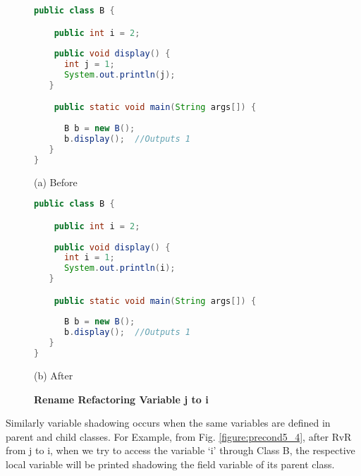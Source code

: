 \begin{figure}[th]
\centering
\begin{minipage}[t]{0.8\linewidth}
\begin{lstlisting}[language=java, basicstyle=\scriptsize\ttfamily,frame=single]
public class B {

    public int i = 2;
    
    public void display() {
      int j = 1;
      System.out.println(j); 		
   }

    public static void main(String args[]) {
    
      B b = new B();
      b.display();  //Outputs 1
   }
}
\end{lstlisting}
\centering(a) Before 
\end{minipage}
\hfill
\begin{minipage}[t]{0.8\linewidth}
\begin{lstlisting}[language=java, basicstyle=\scriptsize\ttfamily,frame=single]
public class B {

    public int i = 2;
    
    public void display() {
      int i = 1;
      System.out.println(i); 		
   }

    public static void main(String args[]) {
    
      B b = new B();
      b.display();  //Outputs 1
   }
}
\end{lstlisting}
\centering(b) After 
\end{minipage}
\caption{\textbf{Rename Refactoring Variable j to i }}
\label{figure:precond5_3}
\end{figure}



Similarly variable shadowing occurs when the same variables are defined in parent and child classes.
For Example, from Fig. \ref{figure:precond5_4}, after RvR from j to i, when we try to access the variable `i'  through Class B, the respective local variable will be printed shadowing the field variable of its parent class.

